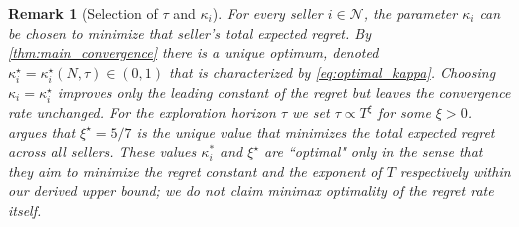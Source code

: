\documentclass{article} %
\newtheorem{remark}[theorem]{Remark}
\begin{document}
\begin{remark}[Selection of $\tau$ and $\kappa_i$]
For every seller $i\in\mathcal{N}$, the parameter $\kappa_i$ can be chosen to minimize that seller’s \emph{total} expected regret. By \cref{thm:main_convergence} there is a unique optimum, denoted $\kappa_i^{\star}=\kappa_i^{\star}(N,\tau)\in (0,1)$ that is characterized by \cref{eq:optimal_kappa}.  Choosing $\kappa_i=\kappa_i^{\star}$ improves only the leading constant of the regret but leaves the convergence \emph{rate} unchanged. For the exploration horizon $\tau$ we set $\tau\propto T^{\xi}$ for some $\xi>0$.   argues that $\xi^{\star} = 5/7$ is the unique value that minimizes the total expected regret across all sellers. These values $\kappa_i^*$ and $\xi^{\star}$ are ``optimal" only in the sense that they aim to minimize the regret constant and the exponent of $T$ respectively within our derived upper bound; we do not claim minimax optimality of the regret rate itself.
\end{remark}
\end{document}

